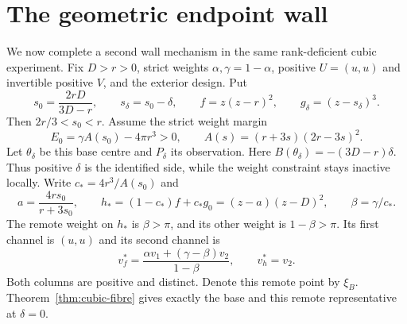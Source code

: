 \section{The geometric endpoint wall}\label{sec:geometric-wall}
We now complete a second wall mechanism in the same rank-deficient cubic
experiment. Fix $D>r>0$, strict weights $\alpha,\gamma=1-\alpha$,
positive $U=(u,u)$ and invertible positive $V$, and the exterior design.
Put
\begin{equation}\label{eq:geometric-centre}
 s_0=\frac{2rD}{3D-r},\qquad s_\delta=s_0-\delta,
 \qquad f=z(z-r)^2,\qquad g_\delta=(z-s_\delta)^3.
\end{equation}
Then $2r/3<s_0<r$. Assume the strict weight margin
\begin{equation}\label{eq:geometric-weight-margin}
 E_0=\gamma A(s_0)-4\pi r^3>0,
 \qquad A(s)=(r+3s)(2r-3s)^2.
\end{equation}
Let $\theta_\delta$ be this base centre and $P_\delta$ its observation.
Here $B(\theta_\delta)=-(3D-r)\delta$. Thus positive $\delta$ is the
identified side, while the weight constraint stays inactive locally.
Write $c_*=4r^3/A(s_0)$ and
\[
 a=\frac{4rs_0}{r+3s_0},\qquad
 h_*=(1-c_*)f+c_*g_0=(z-a)(z-D)^2,\qquad
 \beta=\gamma/c_*.
\]
The remote weight on $h_*$ is $\beta>\pi$, and its other weight is
$1-\beta>\pi$. Its first channel is $(u,u)$ and its second channel is
\begin{equation}\label{eq:geometric-remote-channel}
 v_f^*=\frac{\alpha v_1+(\gamma-\beta)v_2}{1-\beta},\qquad
 v_h^*=v_2.
\end{equation}
Both columns are positive and distinct. Denote this remote point by
$\xi_B$. Theorem~\ref{thm:cubic-fibre} gives exactly the base and this
remote representative at $\delta=0$.


